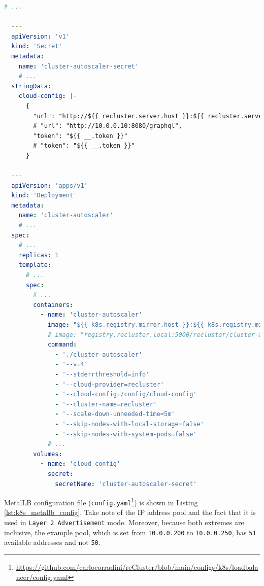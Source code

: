 \begin{lstlisting}[language=yaml, alsoletter={.-1}, morekeywords={1}, morekeywords={[2]{apiVersion, kind, metadata, name, namespace, stringData, cloud-config, labels, app, spec, replicas, selector, matchLabels, template, serviceAccountName, tolerations, containers, image, command, volumeMounts, mountPath, readOnly, volumes, secret, secretName}}, xleftmargin=\parindent, label={lst:k8s_autoscaler_deployment}, caption=Cluster Autoscaler deployment file]
  # ...

  ---
  apiVersion: 'v1'
  kind: 'Secret'
  metadata:
    name: 'cluster-autoscaler-secret'
    # ...
  stringData:
    cloud-config: |-
      {
        "url": "http://${{ recluster.server.host }}:${{ recluster.server.port }}                                /${{ recluster.server.path }}",
        # "url": "http://10.0.0.10:8080/graphql",
        "token": "${{ __.token }}"
        # "token": "${{ __.token }}"
      }

  ---
  apiVersion: 'apps/v1'
  kind: 'Deployment'
  metadata:
    name: 'cluster-autoscaler'
    # ...
  spec:
    # ...
    replicas: 1
    template:
      # ...
      spec:
        # ...
        containers:
          - name: 'cluster-autoscaler'
            image: "${{ k8s.registry.mirror.host }}:${{ k8s.registry.mirror.port }}/recluster                       /cluster-autoscaler"
            # image: "registry.recluster.local:5000/recluster/cluster-autoscaler"
            command:
              - './cluster-autoscaler'
              - '--v=4'
              - '--stderrthreshold=info'
              - '--cloud-provider=recluster'
              - '--cloud-config=/config/cloud-config'
              - '--cluster-name=recluster'
              - '--scale-down-unneeded-time=5m'
              - '--skip-nodes-with-local-storage=false'
              - '--skip-nodes-with-system-pods=false'
            # ...
        volumes:
          - name: 'cloud-config'
            secret:
              secretName: 'cluster-autoscaler-secret'
\end{lstlisting}

MetalLB configuration file (\texttt{config.yaml}\footnote{\url{https://github.com/carlocorradini/reCluster/blob/main/configs/k8s/loadbalancer/config.yaml}})
is shown in Listing \ref{lst:k8s_metallb_config}. Take note of the IP address pool
and the fact that it is used in \texttt{Layer 2 Advertisement} mode. Moreover,
because both extremes are inclusive, the example pool, which is set from \texttt{10.0.0.200}
to \texttt{10.0.0.250}, has \texttt{51} available addresses and not \texttt{50}.

